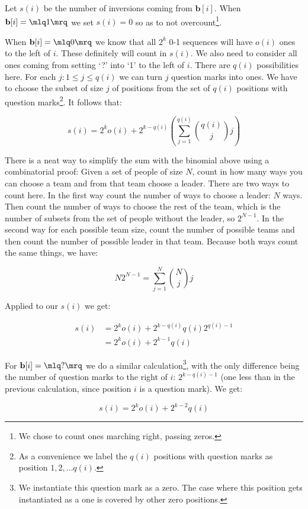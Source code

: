 Let $s(i)$ be the number of inversions coming from $\mathbf{b}[i]$. When $\mathbf{b}[i] = \mlq1\mrq$ we set $s(i) = 0$ so as to not overcount\footnote{We chose to count ones marching right, passing zeros.}.

When $\mathbf{b}[i] = \mlq0\mrq$ we know that all $2^k$ 0-1 sequences will have $o(i)$ ones to the left of $i$. These definitely will count in $s(i)$. We also need to consider all ones coming from setting `?' into `1' to the left of $i$. There are $q(i)$ possibilities here. For each $j: 1 \leq j \leq q(i)$ we can turn $j$ question marks into ones. We have to choose the subset of size $j$ of positions from the set of $q(i)$ positions with question marks\footnote{As a convenience we label the $q(i)$ positions with question marks as position $1, 2, \ldots q(i)$.}. It follows that:

$$
s(i) = 2^k o(i) + 2^{k - q(i)} (\sum_{j = 1}^{q(i)} \binom{q(i)}{j} j)
$$

There is a neat way to simplify the sum with the binomial above using a combinatorial proof: Given a set of people of size $N$, count in how many ways you can choose a team and from that team choose a leader. There are two ways to count here. In the first way count the number of ways to choose a leader: $N$ ways. Then count the number of ways to choose the rest of the team, which is the number of subsets from the set of people without the leader, so $2^{N-1}$.  In the second way for each possible team size, count the number of possible teams and then count the number of possible leader in that team. Because both ways count the same things, we have:

$$
N 2^{N-1} = \sum_{j = 1}^N \binom{N}{j} j
$$

Applied to our $s(i)$ we get:

\begin{align*}
s(i) &= 2^k o(i) + 2^{k - q(i)} q(i) 2^{q(i) - 1} \\
     &= 2^k o(i) + 2^{k - 1} q(i)
\end{align*}

For $\mathbf{b}[i] = \mlq?\mrq$ we do a similar calculation\footnote{We instantiate this question mark as a zero. The case where this position gets instantiated as a one is covered by other zero positions.}, with the only difference being the number of question marks to the right of $i$: $2^{k - q(i) - 1}$ (one less than in the previous calculation, since position $i$ is a question mark). We get:

$$
s(i) = 2^k o(i) + 2^{k - 2} q(i)
$$


